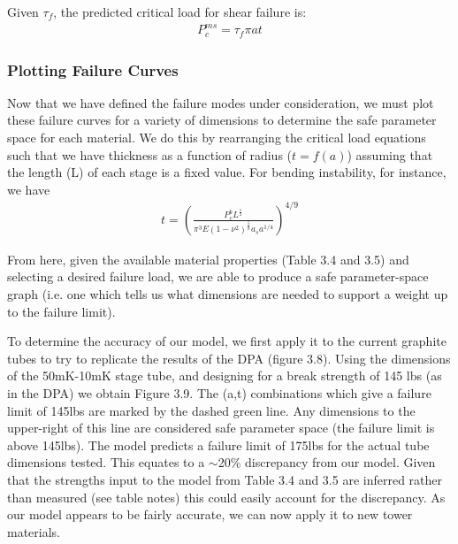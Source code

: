 \documentclass{report}
\begin{document}
Given $\tau_{f}$, the predicted critical load for shear failure is:
\begin{eqnarray}
P_{c}^{ms} = \tau_{f}\pi at
\end{eqnarray}

\subsubsection{Plotting Failure Curves}

Now that we have defined the failure modes under consideration, we must plot these failure curves for a variety of dimensions to determine the safe parameter space for each material. We do this by rearranging the critical load equations such that we have thickness as a function of radius ($t = f(a)$) assuming that the length (L) of each stage is a fixed value. For bending instability, for instance, we have
\begin{eqnarray}
t = \left(\frac{P_{c}^b L^\frac{1}{2}}{\pi^3 E (1-\nu^2)^\frac{5}{8}a_s a^{1/4}}\right)^{4/9}
\end{eqnarray}

From here, given the available material properties (Table 3.4 and 3.5) and selecting a desired failure load, we are able to produce a safe parameter-space graph (i.e. one which tells us what dimensions are needed to support a weight up to the failure limit).

To determine the accuracy of our model, we first apply it to the current graphite tubes to try to replicate the results of the DPA (figure 3.8). Using the dimensions of the 50mK-10mK stage tube, and designing for a break strength of 145 lbs (as in the DPA) we obtain Figure 3.9.  The (a,t) combinations which give a failure limit of 145lbs are marked by the dashed green line. Any dimensions to the upper-right of this line are considered safe parameter space (the failure limit is above 145lbs). The model predicts a failure limit of 175lbs for the actual tube dimensions tested. This equates to a $\sim$20\% discrepancy from our model. Given that the strengths input to the model from Table 3.4 and 3.5 are inferred rather than measured (see table notes) this could easily account for the discrepancy. As our model appears to be fairly accurate, we can now apply it to new tower materials.
\end{document}
